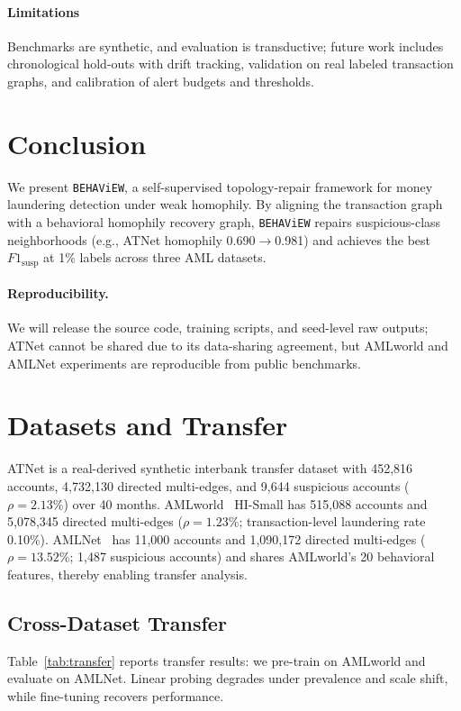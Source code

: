 \documentclass[sigconf,natbib=true,anonymous=true]{acmart}
\theoremstyle{definition}
\newcommand{\method}{\texttt{BEHAViEW}\xspace}
\newcommand{\hofinet}{ATNet\xspace} %
\begin{document}
\paragraph{\textbf{Limitations}}
Benchmarks are synthetic, and evaluation is transductive; future work includes chronological hold-outs with drift tracking, validation on real labeled transaction graphs, and calibration of alert budgets and thresholds.

\section{Conclusion}
We present \method, a self-supervised topology-repair framework for money laundering detection under weak homophily. By aligning the transaction graph with a behavioral homophily recovery graph, \method repairs suspicious-class neighborhoods (e.g., \hofinet homophily 0.690$\to$0.981) and achieves the best $F1_{\text{susp}}$ at 1\% labels across three AML datasets.

\paragraph{\textbf{Reproducibility.}} We will release the source code, training scripts, and seed-level raw outputs; \hofinet cannot be shared due to its data-sharing agreement, but AMLworld and AMLNet experiments are reproducible from public benchmarks.

\appendix

\section{Datasets and Transfer}\label{app:datasets}
\hofinet is a real-derived synthetic interbank transfer dataset with 452,816 accounts, 4,732,130 directed multi-edges, and 9,644 suspicious accounts ($\rho=2.13\%$) over 40 months. AMLworld~\cite{amlpatterns2024realistic} HI-Small has 515,088 accounts and 5,078,345 directed multi-edges ($\rho=1.23\%$; transaction-level laundering rate 0.10\%). AMLNet~\cite{huda2025amlnet} has 11,000 accounts and 1,090,172 directed multi-edges ($\rho=13.52\%$; 1,487 suspicious accounts) and shares AMLworld's 20 behavioral features, thereby enabling transfer analysis.

\subsection{Cross-Dataset Transfer}\label{app:transfer}
Table~\ref{tab:transfer} reports transfer results: we pre-train on AMLworld and evaluate on AMLNet. Linear probing degrades under prevalence and scale shift, while fine-tuning recovers performance.
\end{document}

